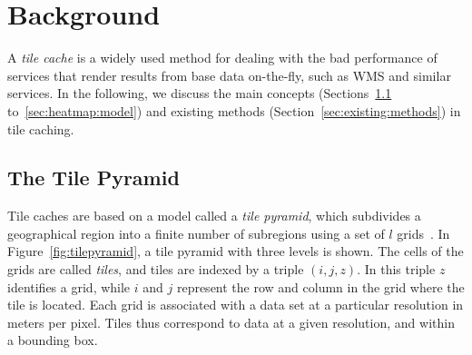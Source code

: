\documentclass[11pt, oneside]{report}
\begin{document}
\section{Background}
\label{sec:tile:caching}

A \emph{tile cache} is a widely used method for dealing with the bad performance of services that render results from base data on-the-fly, such as WMS and similar services. In the following, we discuss the main concepts (Sections~\ref{sec:tile:pyramid} to~\ref{sec:heatmap:model}) and existing methods (Section~\ref{sec:existing:methods}) in tile caching.

\subsection{The Tile Pyramid}
\label{sec:tile:pyramid}

Tile caches are based on a model called a \emph{tile pyramid}, which subdivides a geographical region into a finite number of subregions using a set of $l$ grids~\cite{decola93}. In Figure~\ref{fig:tilepyramid}, a tile pyramid with three levels is shown. The cells of the grids are called \emph{tiles}, and tiles are indexed by a triple $(i,j,z)$. In this triple $z$ identifies a grid, while $i$ and $j$ represent the row and column in the grid where the tile is located. Each grid is associated with a data set at a particular resolution in meters per pixel. Tiles thus correspond to data at a given resolution, and within a bounding box.
\end{document}
